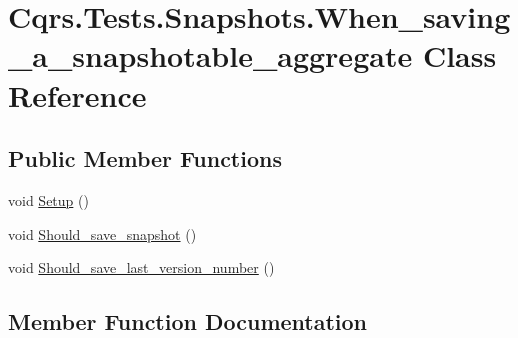 \hypertarget{classCqrs_1_1Tests_1_1Snapshots_1_1When__saving__a__snapshotable__aggregate}{}\section{Cqrs.\+Tests.\+Snapshots.\+When\+\_\+saving\+\_\+a\+\_\+snapshotable\+\_\+aggregate Class Reference}
\label{classCqrs_1_1Tests_1_1Snapshots_1_1When__saving__a__snapshotable__aggregate}
\subsection*{Public Member Functions}
\begin{DoxyCompactItemize}
\item 
void \hyperlink{classCqrs_1_1Tests_1_1Snapshots_1_1When__saving__a__snapshotable__aggregate_a1a36dc6053fa80492b17dec9b95f9808_a1a36dc6053fa80492b17dec9b95f9808}{Setup} ()
\item 
void \hyperlink{classCqrs_1_1Tests_1_1Snapshots_1_1When__saving__a__snapshotable__aggregate_a9d4c5f79d177793da371c5abd056a48d_a9d4c5f79d177793da371c5abd056a48d}{Should\+\_\+save\+\_\+snapshot} ()
\item 
void \hyperlink{classCqrs_1_1Tests_1_1Snapshots_1_1When__saving__a__snapshotable__aggregate_ace9f213932d96510f8556c2722a939a1_ace9f213932d96510f8556c2722a939a1}{Should\+\_\+save\+\_\+last\+\_\+version\+\_\+number} ()
\end{DoxyCompactItemize}


\subsection{Member Function Documentation}
\mbox{\label{classCqrs_1_1Tests_1_1Snapshots_1_1When__saving__a__snapshotable__aggregate_a1a36dc6053fa80492b17dec9b95f9808_a1a36dc6053fa80492b17dec9b95f9808}} 
